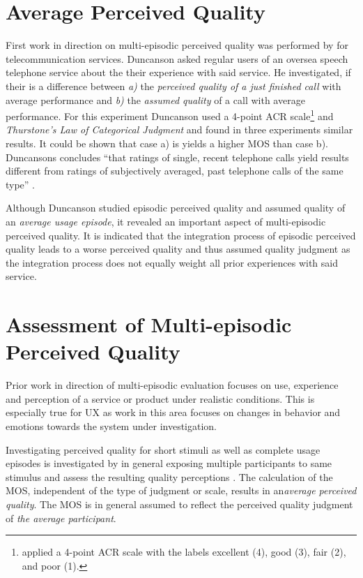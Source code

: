 

\section{Average Perceived Quality \citep{duncanson_average_1969}}
First work in direction on multi-episodic perceived quality was performed by \cite{duncanson_average_1969} for telecommunication services.
Duncanson asked regular users of an oversea speech telephone service about the their experience with said service.
He investigated, if their is a difference between \emph{a)} the \emph{perceived quality of a just finished call} with average performance and \emph{b)} the \emph{assumed quality} of a call with average performance.
For this experiment Duncanson used a 4-point \ac{ACR} scale\footnote{\cite{duncanson_average_1969} applied a 4-point \ac{ACR} scale with the labels excellent (4), good (3), fair (2), and poor (1).} and \emph{Thurstone's Law of Categorical Judgment} and found in three experiments similar results.
It could be shown that case a) is yields a higher \ac{MOS} than case b).
Duncansons concludes ``that ratings of single, recent telephone calls
yield results different from ratings of subjectively averaged, past
telephone calls of the same type'' \citep[][p. 116]{duncanson_average_1969}.

Although Duncanson studied episodic perceived quality and assumed quality of an \emph{average usage episode}, it revealed an important aspect of multi-episodic perceived quality.
It is indicated that the integration process of episodic perceived quality leads to a worse perceived quality and thus assumed quality judgment as the integration process does not equally weight all prior experiences with said service.

\section{Assessment of Multi-episodic Perceived Quality}
Prior work in direction of multi-episodic evaluation focuses on use, experience and perception of a service or product under realistic conditions.
This is especially true for \ac{UX} as work in this area focuses on changes in behavior and emotions towards the system under investigation.

Investigating perceived quality for short stimuli as well as complete usage episodes is investigated by in general exposing multiple participants to same stimulus and assess the resulting quality perceptions \citep[\cf][p. 11]{blauert_spatial_1996}. %
The calculation of the \ac{MOS}, independent of the type of judgment or scale, results in an\emph{average perceived quality}.
The \ac{MOS} is in general assumed to reflect the perceived quality judgment of \emph{the average participant}.

